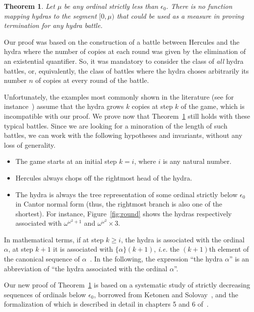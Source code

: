 \documentclass{easychair}
\newtheorem{theorem}{Theorem}
\newcommand{\canonseq}[2]{\mbox{$\{#1\}(#2)$}}
\begin{document}
\begin{theorem}
  Let $\mu$ be any ordinal strictly less than $\epsilon_0$.
  There is no function mapping hydras to the segment $[0,\mu)$ that could be used as a measure in proving termination for \emph{any} hydra battle.\label{thm3}
\end{theorem}

Our proof was based on the construction of a battle between Hercules and the hydra where the
number of copies at each round was given by the elimination of an existential quantifier. So, it was mandatory to consider the class of \emph{all} hydra battles, or, equivalently, the class of battles where the hydra choses arbitrarily its number $n$ of copies at every round of the battle.

Unfortunately, the examples  most commonly shown in the literature
(see for instance~\cite{KP82, bauer2008, BauerHydra}) 
assume that the hydra grows $k$ copies at step $k$ of the game, which is incompatible with our proof.
We prove now that Theorem~\ref{thm3} still holds with these typical battles.
Since we are looking  for a minoration of the length of such battles,
we can work with the following hypotheses and invariants, 
without any loss of generality.
 
 \begin{itemize}
   \item The game starts at an initial step $k=i$, where $i$ is any natural number.
   \item Hercules always chops off the rightmost head of the hydra.
   \item  The hydra is always the tree representation of some ordinal strictly below $\epsilon_0$ in Cantor normal
     form (thus, the rightmost branch is also one of the shortest).
     For instance, Figure~\ref{fig:round} shows the hydras respectively associated with  $\omega^{\omega^2+1}$ and $\omega^{\omega^2}\times 3$.
 \end{itemize}
 
 In mathematical terms, if at step $k\geq i$, the hydra is associated with the ordinal $\alpha$, at step $k+1$ it is associated with
 $\canonseq{\alpha}{k+1}$, \emph{i.e.} the $(k+1)$th element of the canonical sequence of $\alpha$~\cite{KS81}. In the following,  the expression ``the hydra $\alpha$'' is an abbreviation of ``the hydra associated with the ordinal $\alpha$''.
 
 Our new proof of Theorem~\ref{thm3} is based on a systematic study of strictly decreasing sequences of ordinals below $\epsilon_0$, borrowed from Ketonen and Solovay~\cite{KS81}, and the formalization of which is described in detail  in chapters 5 and 6 of~\cite{HydraBook}.
\end{document}
